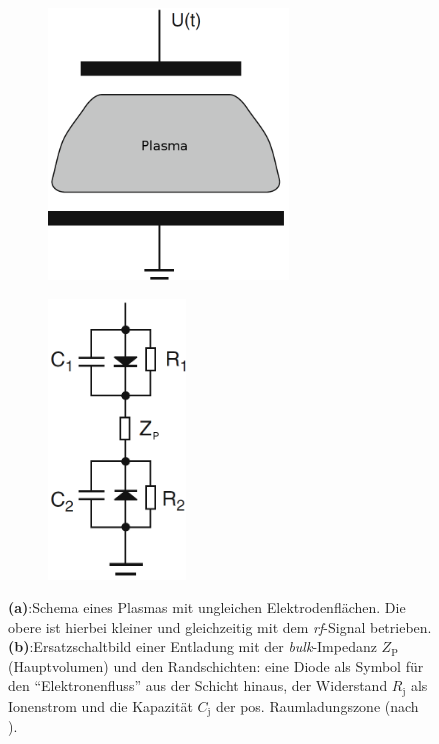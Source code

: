 \documentclass[numbers=noenddot,a4paper]{scrartcl}
\newcommand{\ix}[1]{_\text{#1}}
\newcommand{\tilt}[1]{\textit{#1}}
\newcommand{\fett}[1]{\textbf{#1}}
\begin{document}
						\begin{figure}
							\centering
							\begin{subfigure}[b]{0.48\textwidth}
								\centering
								\includegraphics[width=0.7\textwidth,height=0.8\textwidth]{figs/schaltbildselfbiaspiel1.png}
								\caption{}
								\label{img:ungleichesplasma}
							\end{subfigure}
							\begin{subfigure}[b]{0.48\textwidth}
								\centering
								\includegraphics[width=0.4\textwidth,height=0.8\textwidth]{figs/schaltbildselfbiaspiel2.png}
								\caption{}
								\label{img:ersatzschaltbild}
							\end{subfigure}
							\caption{\fett{(a)}:Schema eines Plasmas mit ungleichen Elektrodenflächen. Die obere ist hierbei kleiner und gleichzeitig mit dem \tilt{rf}-Signal betrieben. \fett{(b)}:Ersatzschaltbild einer Entladung mit der \tilt{bulk}-Impedanz $Z\ix{P}$ (Hauptvolumen) und den Randschichten: eine Diode als Symbol für den "`Elektronenfluss"' aus der Schicht hinaus, der Widerstand $R\ix{j}$ als Ionenstrom und die Kapazität $C\ix{j}$ der pos. Raumladungszone (nach \cite{Piel10}).}
						\end{figure}
\end{document}

